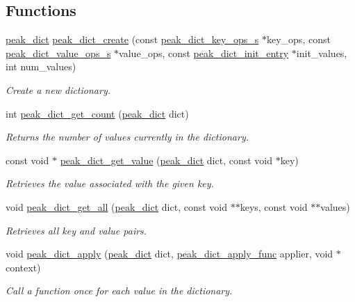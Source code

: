 \subsection*{Functions}
\begin{CompactItemize}
\item 
\hyperlink{group__dict_ga0}{peak\_\-dict} \hyperlink{group__dict_ga22}{peak\_\-dict\_\-create} (const \hyperlink{structpeak__dict__key__ops__s}{peak\_\-dict\_\-key\_\-ops\_\-s} $\ast$key\_\-ops, const \hyperlink{structpeak__dict__value__ops__s}{peak\_\-dict\_\-value\_\-ops\_\-s} $\ast$value\_\-ops, const \hyperlink{structpeak__dict__init__entry}{peak\_\-dict\_\-init\_\-entry} $\ast$init\_\-values, int num\_\-values)
\begin{CompactList}\small\item\em Create a new dictionary. \item\end{CompactList}\item 
int \hyperlink{group__dict_ga23}{peak\_\-dict\_\-get\_\-count} (\hyperlink{group__dict_ga0}{peak\_\-dict} dict)
\begin{CompactList}\small\item\em Returns the number of values currently in the dictionary. \item\end{CompactList}\item 
const void $\ast$ \hyperlink{group__dict_ga24}{peak\_\-dict\_\-get\_\-value} (\hyperlink{group__dict_ga0}{peak\_\-dict} dict, const void $\ast$key)
\begin{CompactList}\small\item\em Retrieves the value associated with the given key. \item\end{CompactList}\item 
void \hyperlink{group__dict_ga25}{peak\_\-dict\_\-get\_\-all} (\hyperlink{group__dict_ga0}{peak\_\-dict} dict, const void $\ast$$\ast$keys, const void $\ast$$\ast$values)
\begin{CompactList}\small\item\em Retrieves all key and value pairs. \item\end{CompactList}\item 
void \hyperlink{group__dict_ga26}{peak\_\-dict\_\-apply} (\hyperlink{group__dict_ga0}{peak\_\-dict} dict, \hyperlink{group__dict_ga21}{peak\_\-dict\_\-apply\_\-func} applier, void $\ast$context)
\begin{CompactList}\small\item\em Call a function once for each value in the dictionary. \item\end{CompactList}\item 

\end{CompactItemize}
